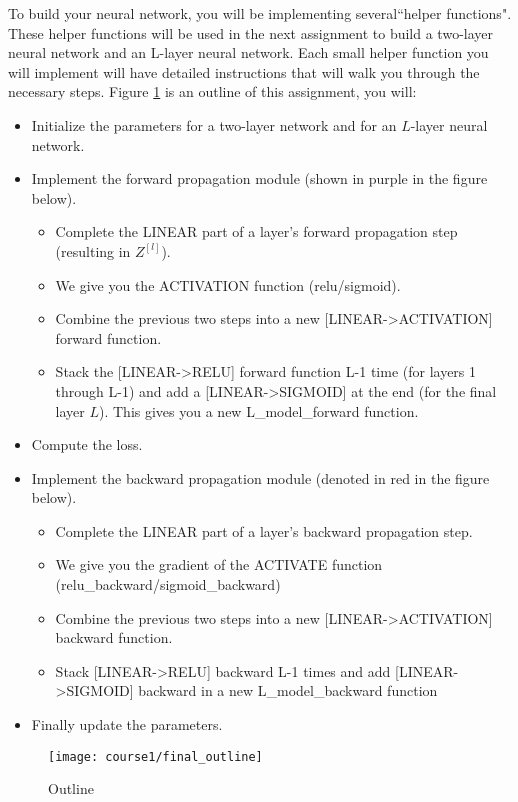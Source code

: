 To build your neural network, you will be implementing several``helper functions". These helper functions will be used in the next assignment to build a two-layer neural network and an L-layer neural network. Each small helper function you will implement will have detailed instructions that will walk you through the necessary steps. Figure \ref{fig:final_outline} is an outline of this assignment, you will:

\begin{itemize}
\item Initialize the parameters for a two-layer network and for an $L$-layer neural network.
\item Implement the forward propagation module (shown in purple in the figure below).
     \begin{itemize}
     \item Complete the LINEAR part of a layer's forward propagation step (resulting in $Z^{[l]}$).
     \item We give you the ACTIVATION function (relu/sigmoid).
     \item Combine the previous two steps into a new [LINEAR->ACTIVATION] forward function.
     \item Stack the [LINEAR->RELU] forward function L-1 time (for layers 1 through L-1) and add a [LINEAR->SIGMOID] at the end (for the final layer $L$). This gives you a new L\_model\_forward function.
     \end{itemize}
\item Compute the loss.
\item Implement the backward propagation module (denoted in red in the figure below).
   \begin{itemize}
    \item Complete the LINEAR part of a layer's backward propagation step.
    \item We give you the gradient of the ACTIVATE function (relu\_backward/sigmoid\_backward) 
    \item Combine the previous two steps into a new [LINEAR->ACTIVATION] backward function.
    \item Stack [LINEAR->RELU] backward L-1 times and add [LINEAR->SIGMOID] backward in a new L\_model\_backward function
    \end{itemize}
\item Finally update the parameters.
\end{itemize}

\begin{figure}[h]
\begin{center}
\texttt{[image: course1/final\_outline]}
\end{center}
\caption{Outline}
\label{fig:final_outline}
\end{figure}

